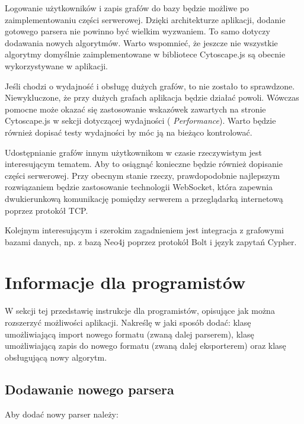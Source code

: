 Logowanie użytkowników i zapis grafów do bazy będzie możliwe po zaimplementowaniu części serwerowej. Dzięki architekturze aplikacji, dodanie gotowego parsera nie powinno być wielkim wyzwaniem. To samo dotyczy dodawania nowych algorytmów. Warto wspomnieć, że jeszcze nie wszystkie algorytmy domyślnie zaimplementowane w bibliotece Cytoscape.js są obecnie wykorzystywane w aplikacji.

Jeśli chodzi o wydajność i obsługę dużych grafów, to nie zostało to sprawdzone. Niewykluczone, że przy dużych grafach aplikacja będzie działać powoli. Wówczas pomocne może okazać się zastosowanie wskazówek zawartych na stronie Cytoscape.js w sekcji dotyczącej wydajności (\cite{cytoscape} \textit{Performance}). Warto będzie również dopisać testy wydajności by móc ją na bieżąco kontrolować. 

Udostępnianie grafów innym użytkownikom w czasie rzeczywistym jest interesującym tematem. Aby to osiągnąć konieczne będzie również dopisanie części serwerowej. Przy obecnym stanie rzeczy, prawdopodobnie najlepszym rozwiązaniem będzie zastosowanie technologii WebSocket, która zapewnia dwukierunkową komunikację pomiędzy serwerem a przeglądarką internetową poprzez protokół TCP. 

Kolejnym interesującym i szerokim zagadnieniem jest integracja z grafowymi bazami danych, np. z bazą Neo4j poprzez protokół Bolt i język zapytań Cypher.

\bigskip

\section{Informacje dla programistów}

W sekcji tej przedstawię instrukcje dla programistów, opisujące jak można rozszerzyć możliwości aplikacji. Nakreślę w jaki sposób dodać: klasę umożliwiającą import nowego formatu (zwaną dalej parserem), klasę umożliwiającą zapis do nowego formatu (zwaną dalej eksporterem) oraz klasę obsługującą nowy algorytm.

\bigskip

\subsection*{Dodawanie nowego parsera}

Aby dodać nowy parser należy:

